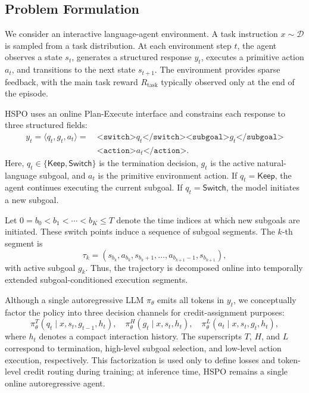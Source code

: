 \documentclass{article}
\newcommand{\wei}[1]{\textcolor{red}{#1}}
\begin{document}
\subsection{Problem Formulation} %
\label{sec:problem_formulation}

We consider an interactive language-agent environment. A task instruction $x \sim \mathcal{D}$ is sampled from a task distribution. At each environment step $t$, the agent observes a state $s_t$, generates a structured response $y_t$, executes a primitive action $a_t$, and transitions to the next state $s_{t+1}$. The environment provides sparse feedback, with the main task reward $R_{\mathrm{task}}$ typically observed only at the end of the episode.

HSPO uses an online Plan-Execute interface and constrains each response to three structured fields:
\begin{equation}
\begin{aligned}
y_t
=
\langle q_t,g_t,a_t\rangle
=
&\ \texttt{<switch>}q_t\texttt{</switch>}
\texttt{<subgoal>}g_t\texttt{</subgoal>} \\
&\ \texttt{<action>}a_t\texttt{</action>}.
\end{aligned}
\label{eq:response}
\end{equation}
Here, $q_t \in \{\mathsf{Keep}, \mathsf{Switch}\}$ is the termination decision, $g_t$ is the active natural-language subgoal, and $a_t$ is the primitive environment action. If $q_t=\mathsf{Keep}$, the agent continues executing the current subgoal. If $q_t=\mathsf{Switch}$, the model initiates a new subgoal.

Let $0=b_0<b_1<\cdots<b_K\leq T$ denote the time indices at which new subgoals are initiated. These switch points induce a sequence of subgoal segments. The $k$-th segment is
\begin{equation}
\tau_k
=
(s_{b_k},a_{b_k},s_{b_k+1},\ldots,a_{b_{k+1}-1},s_{b_{k+1}}),
\label{eq:segment}
\end{equation}
with active subgoal $g_k$. Thus, the trajectory is decomposed online into temporally extended subgoal-conditioned execution segments.

Although a single autoregressive LLM $\pi_\theta$ emits all tokens in $y_t$, we conceptually factor the policy into three decision channels for credit-assignment purposes:
\begin{equation}
\pi_\theta^T(q_t \mid x,s_t,g_{t-1},h_t),\quad
\pi_\theta^H(g_t \mid x,s_t,h_t),\quad
\pi_\theta^L(a_t \mid x,s_t,g_t,h_t),
\label{eq:factorization}
\end{equation}
where $h_t$ denotes a compact interaction history. The superscripts $T$, $H$, and $L$ correspond to termination, high-level subgoal selection, and low-level action execution, respectively. This factorization is used only to define losses and token-level credit routing during training; at inference time, HSPO remains a single online autoregressive agent.
\end{document}
